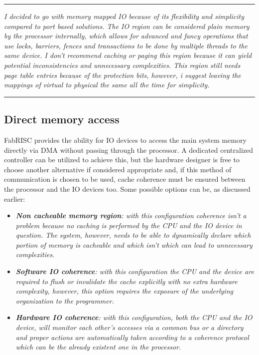 \documentclass{article}
\begin{document}
            \vspace{10pt}
            
            \vspace{10pt}

        \par\noindent\rule{\textwidth}{0.4pt}
        \textit{I decided to go with memory mapped IO because of its flexibility and simplicity compared to port based solutions. The IO region can be considered plain memory by the processor internally, which allows for advanced and fancy operations that use locks, barriers, fences and transactions to be done by multiple threads to the same device. I don't recommend caching or paging this region because it can yield potential inconsistencies and unnecessary complexities. This region still needs page table entries because of the protection bits, however, i suggest leaving the mappings of virtual to physical the same all the time for simplicity.}
        \par\noindent\rule{\textwidth}{0.4pt}

        \subsection{Direct memory access}

            FabRISC provides the ability for IO devices to access the main system memory directly via DMA without passing through the processor. A dedicated centralized controller can be utilized to achieve this, but the hardware designer is free to choose another alternative if considered appropriate and, if this method of communication is chosen to be used, cache coherence must be ensured between the processor and the IO devices too. Some possible options can be, as discussed earlier:

            \begin{itemize}

                \item \textit{\textbf{Non cacheable memory region}: with this configuration coherence isn't a problem because no caching is performed by the CPU and the IO device in question. The system, however, needs to be able to dynamically declare which portion of memory is cacheable and which isn't which can lead to unnecessary complexities.}

                \item \textit{\textbf{Software IO coherence}: with this configuration the CPU and the device are required to flush or invalidate the cache explicitly with no extra hardware complexity, however, this option requires the exposure of the underlying organization to the programmer.}

                \item \textit{\textbf{Hardware IO coherence}: with this configuration, both the CPU and the IO device, will monitor each other's accesses via a common bus or a directory and proper actions are automatically taken according to a coherence protocol which can be the already existent one in the processor.}

            \end{itemize}
\end{document}

